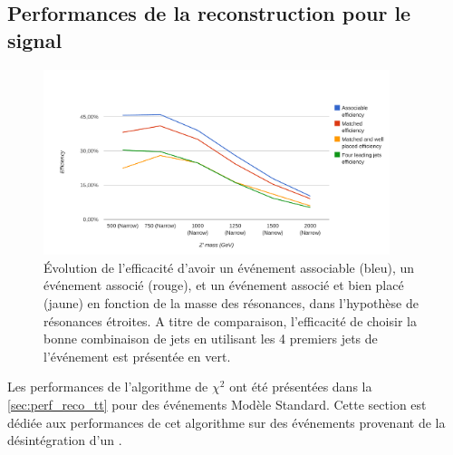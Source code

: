 \subsection{Performances de la reconstruction pour le signal}

\begin{figure}[tbp]
  \centering
  \includegraphics[width=0.9\textwidth]{chapitre7/figs/chi2_eff_vs_zprime_mass.pdf}
  \caption{Évolution de l'efficacité d'avoir un événement associable (bleu), un événement associé (rouge), et un événement associé et bien placé (jaune) en fonction de la masse des résonances, dans l'hypothèse de résonances étroites. A titre de comparaison, l'efficacité de choisir la bonne combinaison de jets en utilisant les 4 premiers jets de l'événement est présentée en vert.}
  \label{fig:eff_vs_zprime}
\end{figure}

Les performances de l'algorithme de $\chi^2$ ont été présentées dans la \cref{sec:perf_reco_tt} pour des événements \ttbar Modèle Standard. Cette section est dédiée aux performances de cet algorithme sur des événements \ttbar provenant de la désintégration d'un \zprime.

